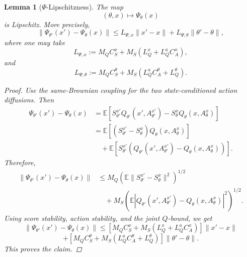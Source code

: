 \documentclass{article}
\newtheorem{lem}[thm]{Lemma}
\theoremstyle{definition}
\theoremstyle{remark}
\theoremstyle{mystyle}
\newcommand{\1}{\mathbbm{1}}
\begin{document}
\begin{lem}[\(\Psi\)-Lipschitzness]
The map
\[
(\theta,x)\mapsto \Psi_\theta(x)
\]
is Lipschitz. More precisely,
\[
\|\Psi_{\theta'}(x')-\Psi_\theta(x)\|
\le
L_{\Psi,x}\|x'-x\|
+
L_{\Psi,\theta}\|\theta'-\theta\|,
\tag{Psi}
\]
where one may take
\[
L_{\Psi,x}
:=
M_QC_S^x
+
M_S(L_Q^x+L_Q^aC_A^x),
\]
and
\[
L_{\Psi,\theta}
:=
M_QC_S^\theta
+
M_S(L_Q^aC_A^\theta+L_Q^\theta).
\]

\begin{proof}
Use the same-Brownian coupling for the two state-conditioned action diffusions. Then
\[
\begin{aligned}
\Psi_{\theta'}(x')-\Psi_\theta(x)
&=
\mathbb E
\left[
S_{\theta'}^{x'}Q_{\theta'}(x',A_{\theta'}^{x'})
-
S_\theta^xQ_\theta(x,A_\theta^x)
\right]
\\
&=
\mathbb E
\left[
(S_{\theta'}^{x'}-S_\theta^x)Q_\theta(x,A_\theta^x)
\right]
\\
&\quad+
\mathbb E
\left[
S_{\theta'}^{x'}
\left(
Q_{\theta'}(x',A_{\theta'}^{x'})
-
Q_\theta(x,A_\theta^x)
\right)
\right].
\end{aligned}
\]
Therefore,
\[
\begin{aligned}
\|\Psi_{\theta'}(x')-\Psi_\theta(x)\|
&\le
M_Q
\left(
\mathbb E
\|S_{\theta'}^{x'}-S_\theta^x\|^2
\right)^{1/2}
\\
&\quad+
M_S
\left(
\mathbb E
\left|
Q_{\theta'}(x',A_{\theta'}^{x'})
-
Q_\theta(x,A_\theta^x)
\right|^2
\right)^{1/2}.
\end{aligned}
\]
Using score stability, action stability, and the joint \(Q\)-bound, we get
\[
\|\Psi_{\theta'}(x')-\Psi_\theta(x)\|
\le
\left[
M_QC_S^x
+
M_S(L_Q^x+L_Q^aC_A^x)
\right]\|x'-x\|
\]
\[
+
\left[
M_QC_S^\theta
+
M_S(L_Q^aC_A^\theta+L_Q^\theta)
\right]\|\theta'-\theta\|.
\]
This proves the claim.
\end{proof}
\end{lem}
\end{document}
